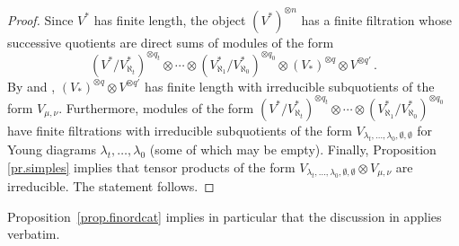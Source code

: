 \documentclass[11pt]{article}
\theoremstyle{plain}
\theoremstyle{nonumberplain}
\theoremstyle{plain}
\theoremstyle{nonumberplain}
\newtheorem{proof}{Proof}
\newcommand\bT{\mathbb T}
\newcommand\al{\aleph}
\begin{document}
\begin{proof}
	Since $V^*$ has finite length, the object $\left(V^*\right)^{\otimes n}$ has a finite filtration whose successive quotients are direct sums of modules of the form $$\left(V^*/V^*_{\aleph_t}\right)^{\otimes q_t}\otimes \cdots \otimes \left(V^*_{\aleph_{1}} / V^*_{\aleph_0}\right)^{\otimes q_0}\otimes \left(V_*\right)^{\otimes q} \otimes V^{\otimes q'}\,.$$	
By \cite{PS2} and \cite{PS}, $\left(V_*\right)^{\otimes q} \otimes V^{\otimes q'}$ has finite length with irreducible subquotients of the form $V_{\mu,\nu}$.  Furthermore, modules of the form $\left(V^*/V^*_{\aleph_t}\right)^{\otimes q_t}\otimes \cdots \otimes \left(V^*_{\aleph_{1}} / V^*_{\aleph_0}\right)^{\otimes q_0}$ have finite filtrations with irreducible subquotients of the form $V_{\lambda_t,\ldots,\lambda_0,\emptyset,\emptyset}$ for Young diagrams $\lambda_t,\ldots,\lambda_0$ (some of which may be empty).   Finally, Proposition \ref{pr.simples} implies that tensor products of the form $V_{\lambda_t,\ldots,\lambda_0,\emptyset,\emptyset}\otimes V_{\mu,\nu}$ are irreducible.  The statement follows.
\end{proof}

	Proposition~\ref{prop.finordcat} implies in particular that the discussion in \cite[Section 2]{us2} applies verbatim.


%
%
\end{document}
